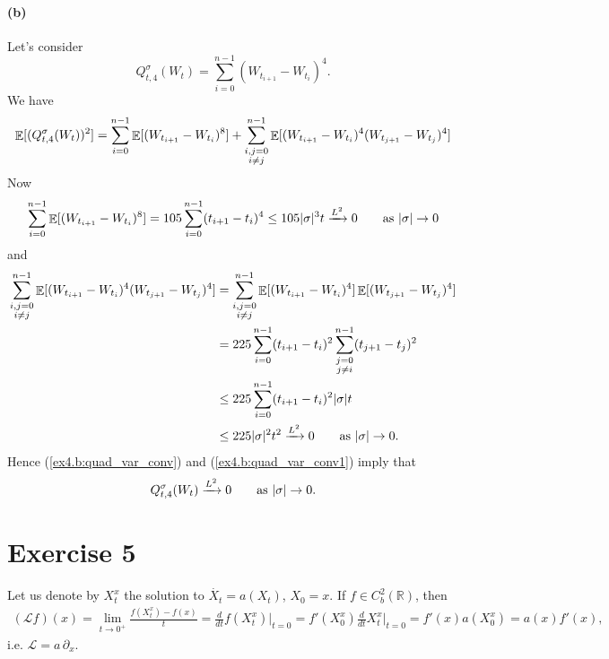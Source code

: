 \documentclass[a4paper,11pt]{article}
\theoremstyle{definition}
\theoremstyle{plain}
\theoremstyle{remark}
\DeclarePairedDelimiter{\abs}{\lvert}{\rvert}
\DeclarePairedDelimiter{\parq}{[}{]}
\DeclareMathOperator*{\expval}{\mathbb{E}}
\begin{document}
\paragraph*{(b)}

Let's consider
$$
Q_{t,4}^\sigma(W_t) = \sum_{i=0}^{n-1}(W_{t_{i+1}}-W_{t_i})^4.
$$
We have
$$
\expval\parq{(Q_{t,4}^\sigma(W_t))^2} = \sum_{i=0}^{n-1}\expval\parq{(W_{t_{i+1}}-W_{t_i})^8} + \sum_{\substack{i,j=0 \\ i\neq j}}^{n-1}\expval\parq{(W_{t_{i+1}}-W_{t_i})^4(W_{t_{j+1}}-W_{t_j})^4}
$$
Now
\begin{equation}\label{ex4.b:quad_var_conv}
\sum_{i=0}^{n-1}\expval\parq{(W_{t_{i+1}}-W_{t_i})^8} = 105\sum_{i=0}^{n-1}(t_{i+1}-t_i)^4 \leq 105\abs\sigma^3t \xrightarrow{L^2} 0 \qquad \text{as } \abs{\sigma}\to0
\end{equation}
and 
\begin{align}
\sum_{\substack{i,j=0 \\ i\neq j}}^{n-1}\expval\parq{(W_{t_{i+1}}-W_{t_i})^4(W_{t_{j+1}}-W_{t_j})^4} & = \sum_{\substack{i,j=0 \\ i\neq j}}^{n-1}\expval\parq{(W_{t_{i+1}}-W_{t_i})^4}\expval\parq{(W_{t_{j+1}}-W_{t_j})^4} \notag \\ & = 225\sum_{i=0}^{n-1}(t_{i+1}-t_i)^2\sum_{\substack{j=0 \\ j\neq i}}^{n-1}(t_{j+1}-t_j)^2  \notag \\ & \leq 225\sum_{i=0}^{n-1}(t_{i+1}-t_i)^2\abs\sigma t \notag \\ & \leq 225\abs\sigma^2t^2 \xrightarrow{L^2} 0 \qquad \text{as } \abs{\sigma}\to0.\label{ex4.b:quad_var_conv1}
\end{align}
Hence (\ref{ex4.b:quad_var_conv}) and (\ref{ex4.b:quad_var_conv1}) imply that 
$$
Q_{t,4}^\sigma(W_t) \xrightarrow{L^2} 0 \qquad \text{as } \abs{\sigma}\to0.
$$

\section*{Exercise 5}

Let us denote by $X_t^x$ the solution to $\dot{X_t}=a(X_t)$, $X_0=x$. If $f\in C^2_b(\mathbb{R})$, then
\begin{align*}
(\mathcal{L}f)(x) = \lim_{t\to 0^+}\frac{f(X_t^x) - f(x)}{t} = \frac{d}{dt}f(X_t^x)\Big|_{t=0} = f'(X_0^x)\frac{d}{dt}X_t^x\Big|_{t=0} = f'(x)a(X^x_0) = a(x)f'(x),
\end{align*}
i.e. $\mathcal{L} = a\,\partial_x$.
\end{document}
